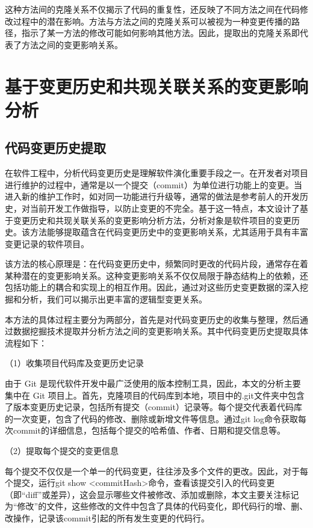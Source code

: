 这种方法间的克隆关系不仅揭示了代码的重复性，还反映了不同方法之间在代码修改过程中的潜在影响。方法与方法之间的克隆关系可以被视为一种变更传播的路径，指示了某一方法的修改可能如何影响其他方法。因此，提取出的克隆关系即代表了方法之间的变更影响关系。

\section{基于变更历史和共现关联关系的变更影响分析}
\subsection{代码变更历史提取}

在软件工程中，分析代码变更历史是理解软件演化重要手段之一。在开发者对项目进行维护的过程中，通常是以一个提交（commit）为单位进行功能上的变更。当进入新的维护工作时，如对同一功能进行升级等，通常的做法是参考前人的开发历史，对当前开发工作做指导，以防止变更的不完全。基于这一特点，本文设计了基于变更历史和共现关联关系的变更影响分析方法，分析对象是软件项目的变更历史。该方法能够提取蕴含在代码变更历史中的变更影响关系，尤其适用于具有丰富变更记录的软件项目。

该方法的核心原理是：在代码变更历史中，频繁同时更改的代码片段，通常存在着某种潜在的变更影响关系。这种变更影响关系不仅仅局限于静态结构上的依赖，还包括功能上的耦合和实现上的相互作用。因此，通过对这些历史变更数据的深入挖掘和分析，我们可以揭示出更丰富的逻辑型变更关系。

本方法的具体过程主要分为两部分，首先是对代码变更历史的收集与整理，然后通过数据挖掘技术提取并分析方法之间的变更影响关系。其中代码变更历史提取具体流程如下：

（1）收集项目代码库及变更历史记录

由于 Git 是现代软件开发中最广泛使用的版本控制工具，因此，本文的分析主要集中在 Git 项目上。首先，克隆项目的代码库到本地，项目中的.git文件夹中包含了版本变更历史记录，包括所有提交（commit）记录等。每个提交代表着代码库的一次变更，包含了代码的修改、删除或新增文件等信息。通过git log命令获取每次commit的详细信息，包括每个提交的哈希值、作者、日期和提交信息等。

（2）提取每个提交的变更信息

每个提交不仅仅是一个单一的代码变更，往往涉及多个文件的更改。因此，对于每个提交，运行git show <commitHash>命令，查看该提交引入的代码变更（即“diff”或差异），这会显示哪些文件被修改、添加或删除，本文主要关注标记为“修改”的文件，这些修改的文件中包含了具体的代码变化，即代码行的增、删、改操作，记录该commit引起的所有发生变更的代码行。

